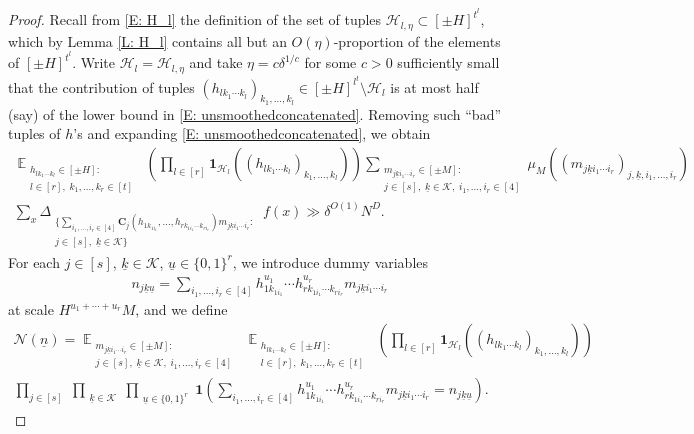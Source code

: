 \documentclass[11pt]{amsart}
\theoremstyle{definition}
\DeclareMathOperator*{\E}{\mathbb{E}}
\newcommand{\CH}{{\mathcal H}}
\newcommand{\CK}{{\mathcal K}}
\newcommand{\CN}{{\mathcal N}}
\newcommand{\bc}{{\textbf{C}}}
\newcommand{\uk}{{\underline{k}}}
\newcommand{\un}{{\underline{n}}}
\newcommand{\uu}{{\underline{u}}}
\newcommand{\brac}[1]{\mathopen{}\left( #1 \mathclose{}\right)}
\begin{document}
\begin{proof}
Recall from \eqref{E: H_l} the definition of the set of tuples $\CH_{l,\eta}\subset[\pm H]^{t^l}$, which by Lemma \ref{L: H_l} contains all but an $O(\eta)$-proportion of the elements of $[\pm H]^{t^l}$. Write $\CH_l = \CH_{l, \eta}$ and take $\eta = c\delta^{1/c}$ for some $c>0$ sufficiently small that the contribution of tuples $(h_{l k_1\cdots k_l})_{k_1, \ldots, k_l} \in [\pm H]^{l^t} \setminus \CH_l$ is at most half (say) of the lower bound in \eqref{E: unsmoothedconcatenated}.  Removing such ``bad'' tuples of $h$'s and expanding \eqref{E: unsmoothedconcatenated}, we obtain
    \begin{multline}\label{E: expanded}
        \E_{\substack{h_{lk_1\cdots k_l}\in[\pm H]:\\ l\in[r],\; k_1, \ldots, k_r\in[t]}}\; \brac{ \prod_{l\in[r]}\mathbf{1}_{\CH_l}((h_{l k_1\cdots k_l})_{k_1, \ldots, k_l})}\sum_{\substack{m_{j\uk i_1\cdots i_r}\in[\pm M]:\\ j\in[s],\; \uk\in\CK,\; i_1, \ldots,  i_r\in[4]}} \mu_M((m_{j\uk i_1\cdots i_r})_{j, \uk, i_1, \ldots, i_r})\\
        \sum_x \Delta_{\substack{\{\sum\limits_{i_1, \ldots, i_r\in[4]}\bc_j(h_{1k_{1i_1}}, \ldots, h_{rk_{1i_1}\cdots k_{ri_r}})m_{j \uk i_1\cdots i_r}:\\ j\in[s],\; \uk\in\CK\}}}\; f(x) \gg \delta^{O(1)} N^D.
    \end{multline}
For each $j\in[s]$, $\uk\in\CK$, $\uu\in\{0,1\}^r$, we introduce dummy variables 
    \begin{align}\label{E: n_jku}
        n_{j\uk\uu} = \sum\limits_{i_1, \ldots, i_r\in[4]} h_{1k_{1i_1}}^{u_1} \cdots h_{rk_{1i_1}\cdots k_{ri_r}}^{u_r}m_{j\uk i_1\cdots i_r}
    \end{align}
    at scale $H^{u_1+\cdots + u_r}M$, and we define \begin{multline*}
        \CN(\un) = \E_{\substack{m_{j\uk i_1\cdots i_r}\in[\pm M]:\\ j\in[s],\; \uk\in\CK,\; i_1, \ldots,  i_r\in[4]}} \; 
        \E_{\substack{h_{lk_{1}\cdots k_{l}}\in[\pm H]:\\ l\in[r],\; k_1, \ldots, k_r\in[t] }}\; \brac{\prod_{l\in[r]}\mathbf{1}_{\CH_l}((h_{l k_1\cdots k_l})_{k_1, \ldots, k_l})} \\
        \prod_{j\in[s]}\; \prod_{\substack{\uk\in\CK}}\prod_{\substack{\uu\in\{0,1\}^r
        }} \mathbf{1}\brac{\sum\limits_{i_1, \ldots, i_r\in[4]} h_{1k_{1i_1}}^{u_1} \cdots h_{rk_{1i_1}\cdots k_{ri_r}}^{u_r}m_{j\uk i_1\cdots i_r} = n_{j\uk\uu}}.
    \end{multline*}

\end{proof}
\end{document}
